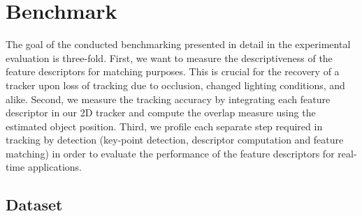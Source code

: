 \section{Benchmark}

The goal of the conducted benchmarking presented in detail in the experimental evaluation is three-fold. First, we want to measure the descriptiveness of the feature descriptors for matching purposes. This is crucial for the recovery of a tracker upon loss of tracking due to occlusion, changed lighting conditions, and alike. Second, we measure the tracking accuracy by integrating each feature descriptor in our 2D tracker and compute the overlap measure using the estimated object position. Third, we profile each separate step required in tracking by detection (key-point detection, descriptor computation and feature matching) in order to evaluate the performance of the feature descriptors for real-time applications.

\subsection{Dataset}

